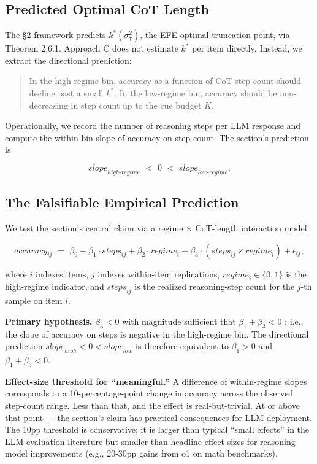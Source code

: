 \documentclass{article}
\begin{document}
\subsection{Predicted Optimal CoT
Length}\label{predicted-optimal-cot-length}

The \S{}2 framework predicts \(k^{*}(\sigma_{\tau}^{2})\), the EFE-optimal
truncation point, via Theorem 2.6.1. Approach C does not estimate
\(k^{*}\) per item directly. Instead, we extract the directional
prediction:

\begin{quote}
In the high-regime bin, accuracy as a function of CoT step count should
decline past a small \(k^{*}\). In the low-regime bin, accuracy should
be non-decreasing in step count up to the cue budget \(K\).
\end{quote}

Operationally, we record the number of reasoning steps per LLM response
and compute the within-bin slope of accuracy on step count. The
section's prediction is

\[{slope}_{high\text{-}regime}\mspace{6mu} < \mspace{6mu} 0\mspace{6mu} < \mspace{6mu}{slope}_{low\text{-}regime}.\]

\subsection{The Falsifiable Empirical
Prediction}\label{the-falsifiable-empirical-prediction}

We test the section's central claim via a regime \(\times\) CoT-length
interaction model:

\[{accuracy}_{ij}\mspace{6mu} = \mspace{6mu}\beta_{0} + \beta_{1} \cdot {steps}_{ij} + \beta_{2} \cdot {regime}_{i} + \beta_{3} \cdot ({steps}_{ij} \times {regime}_{i}) + \epsilon_{ij},\]

where \(i\) indexes items, \(j\) indexes within-item replications,
\({regime}_{i} \in \{ 0,1\}\) is the high-regime indicator, and
\({steps}_{ij}\) is the realized reasoning-step count for the \(j\)-th
sample on item \(i\).

\textbf{Primary hypothesis.} \(\beta_{3} < 0\) with magnitude sufficient
that \(\beta_{1} + \beta_{3} < 0\) ; i.e., the slope of accuracy on
steps is negative in the high-regime bin. The directional prediction
\({slope}_{high} < 0 < {slope}_{low}\) is therefore equivalent to
\(\beta_{1} > 0\) and \(\beta_{1} + \beta_{3} < 0\).

\textbf{Effect-size threshold for ``meaningful.''} A difference of
within-regime slopes corresponds to a 10-percentage-point change in
accuracy across the observed step-count range. Less than that, and the
effect is real-but-trivial. At or above that point --- the section's
claim has practical consequences for LLM deployment. The 10pp threshold
is conservative; it is larger than typical ``small effects'' in the
LLM-evaluation literature but smaller than headline effect sizes for
reasoning-model improvements (e.g., 20-30pp gains from o1 on math
benchmarks).
\end{document}
